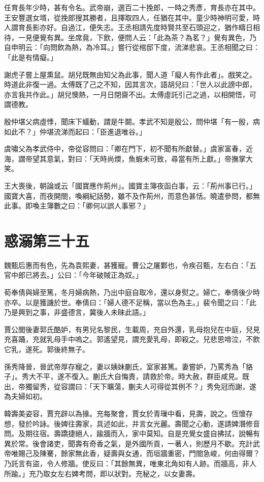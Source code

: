 任育長年少時，甚有令名。武帝崩，選百二十挽郎，一時之秀彥，育長亦在其中。王安豐選女壻，從挽郎搜其勝者，且擇取四人，任猶在其中。童少時神明可愛，時人謂育長影亦好。自過江，便失志。王丞相請先度時賢共至石頭迎之，猶作疇日相待，一見便覺有異。坐席竟，下飲，便問人云：「此為茶？為茗？」覺有異色，乃自申明云：「向問飲為熱，為冷耳。」嘗行從棺邸下度，流涕悲哀。王丞相聞之曰：「此是有情癡。」

謝虎子嘗上屋熏鼠。胡兒既無由知父為此事，聞人道「癡人有作此者」。戲笑之。時道此非復一過。太傅既了己之不知，因其言次，語胡兒曰：「世人以此謗中郎，亦言我共作此。」胡兒懊熱，一月日閉齋不出。太傅虛託引己之過，以相開悟，可謂德教。

殷仲堪父病虛悸，聞床下蟻動，謂是牛鬬。孝武不知是殷公，問仲堪「有一殷，病如此不？」仲堪流涕而起曰：「臣進退唯谷。」

虞嘯父為孝武侍中，帝從容問曰：「卿在門下，初不聞有所獻替。」虞家富春，近海，謂帝望其意氣，對曰：「天時尚煗，魚蝦未可致，尋當有所上獻。」帝撫掌大笑。

王大喪後，朝論或云「國寶應作荊州」。國寶主簿夜函白事，云：「荊州事已行。」國寶大喜，而夜開閤，喚綱紀話勢，雖不及作荊州，而意色甚恬。曉遣參問，都無此事。即喚主簿數之曰：「卿何以誤人事邪？」



\chapter{惑溺第三十五}

魏甄后惠而有色，先為袁熙妻，甚獲寵。曹公之屠鄴也，令疾召甄，左右白：「五官中郎已將去。」公曰：「今年破賊正為奴。」

荀奉倩與婦至篤，冬月婦病熱，乃出中庭自取冷，還以身熨之。婦亡，奉倩後少時亦卒。以是獲譏於世。奉倩曰：「婦人德不足稱，當以色為主。」裴令聞之曰：「此乃是興到之事，非盛德言，冀後人未昧此語。」

賈公閭後妻郭氏酷妒，有男兒名黎民，生載周，充自外還，乳母抱兒在中庭，兒見充喜踊，充就乳母手中嗚之。郭遙望見，謂充愛乳母，即殺之。兒悲思啼泣，不飲它乳，遂死。郭後終無子。

孫秀降晉，晉武帝厚存寵之，妻以姨妹蒯氏，室家甚篤。妻嘗妒，乃罵秀為「貉子」。秀大不平，遂不復入。蒯氏大自悔責，請救於帝。時大赦，群臣咸見。既出，帝獨留秀，從容謂曰：「天下曠蕩，蒯夫人可得從其例不？」秀免冠而謝，遂為夫婦如初。

韓壽美姿容，賈充辟以為掾。充每聚會，賈女於青璅中看，見壽，說之。恆懷存想，發於吟詠。後婢往壽家，具述如此，并言女光麗。壽聞之心動，遂請婢潛修音問。及期往宿。壽蹻捷絕人，踰牆而入，家中莫知。自是充覺女盛自拂拭，說暢有異於常。後會諸吏，聞壽有奇香之氣，是外國所貢，一著人，則歷月不歇。充計武帝唯賜己及陳騫，餘家無此香，疑壽與女通，而垣牆重密，門閤急峻，何由得爾？乃託言有盜，令人修牆。使反曰：「其餘無異，唯東北角如有人跡。而牆高，非人所踰。」充乃取女左右婢考問，即以狀對。充秘之，以女妻壽。

